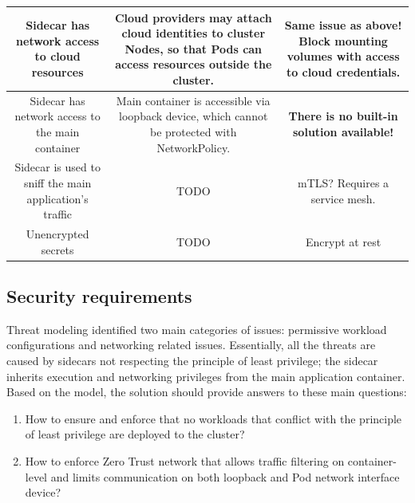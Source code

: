 \documentclass[english, 12pt, a4paper, sci, utf8, a-2b, online]{aaltothesis}
\begin{document}
\begin{table}[H]
\begin{minipage}{\textwidth}
\begin{tabularx}{\textwidth}{CCC}
    Sidecar has network access to cloud resources & Cloud providers may attach cloud identities to cluster Nodes, so that Pods can access resources outside the cluster. & \textbf{Same issue as above!} Block mounting volumes with access to cloud credentials. \\ \hline
    Sidecar has network access to the main container & Main container is accessible via loopback device, which cannot be protected with NetworkPolicy. & \textbf{There is no built-in solution available!} \\ \hline
    Sidecar is used to sniff the main application's traffic & TODO & mTLS? Requires a service mesh. \\ \hline
    Unencrypted secrets & TODO & Encrypt at rest \\ \hline
  \end{tabularx}
\end{minipage}
\end{table}


\subsection{Security requirements}

Threat modeling identified two main categories of issues: permissive workload configurations and networking related issues. Essentially, all the threats are caused by sidecars not respecting the principle of least privilege; the sidecar inherits execution and networking privileges from the main application container. Based on the model, the solution should provide answers to these main questions:


\begin{enumerate}
  \item How to ensure and enforce that no workloads that conflict with the principle of least privilege are deployed to the cluster?
  \item How to enforce Zero Trust network that allows traffic filtering on container-level and limits communication on both loopback and Pod network interface device?
\end{enumerate}
\end{document}
